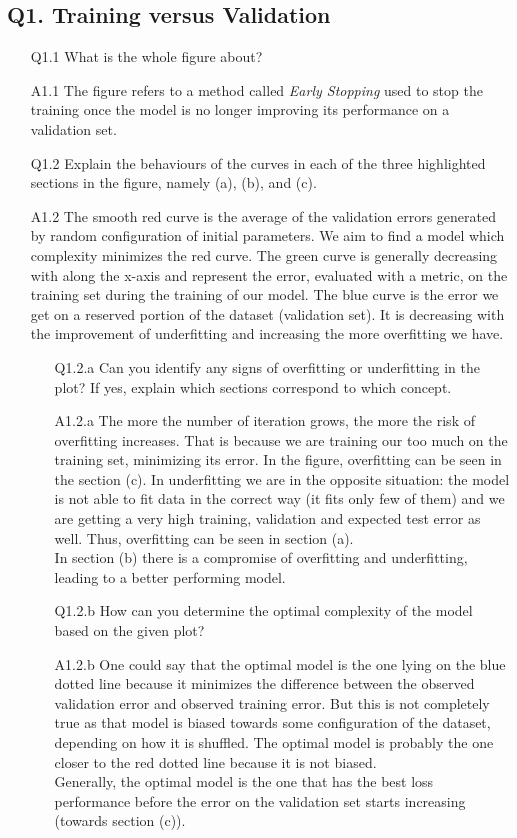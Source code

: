 \documentclass[11pt]{scrartcl}
\begin{document}
\subsection*{Q1. Training versus Validation}
\begin{itemize}
\item[Q1.1] What is the whole figure about?  
\item[A1.1] The figure refers to a method called \textit{Early Stopping} used to stop the training once the model is no longer improving its performance on a validation set.
\item[Q1.2] Explain the behaviours of the curves in each of the three highlighted sections in the figure, namely (a), (b), and (c).   
\item[A1.2] The smooth red curve is the average of the validation errors generated by random configuration of initial parameters. We aim to find a model which complexity minimizes the red curve. The green curve is generally decreasing with along the x-axis and represent the error, evaluated with a metric, on the training set during the training of our model. The blue curve is the error we get on a reserved portion of the dataset (validation set). It is decreasing with the improvement of underfitting and increasing the more overfitting we have. 

\begin{itemize}
\item[Q1.2.a] Can you identify any signs of overfitting or underfitting in the plot? If yes, explain which sections correspond to which concept.
\item[A1.2.a] The more the number of iteration grows, the more the risk of overfitting increases. That is because we are training our too much on the training set, minimizing its error. In the figure, overfitting can be seen in the section (c). In underfitting we are in the opposite situation: the model is not able to fit data in the correct way (it fits only few of them) and we are getting a very high training, validation and expected test error as well. Thus, overfitting can be seen in section (a).\\
In section (b) there is a compromise of overfitting and underfitting, leading to a better performing model.

\item[Q1.2.b] How can you determine the optimal complexity of the model based on the given plot?
\item[A1.2.b] One could say that the optimal model is the one lying on the blue dotted line because it minimizes the difference between the observed validation error and observed training error. But this is not completely true as that model is biased towards some configuration of the dataset, depending on how it is shuffled. The optimal model is probably the one closer to the red dotted line because it is not biased. \\
Generally, the optimal model is the one that has the best loss performance before the error on the validation set starts increasing (towards section (c)).
\end{itemize}
	

\end{itemize}
\end{document}

